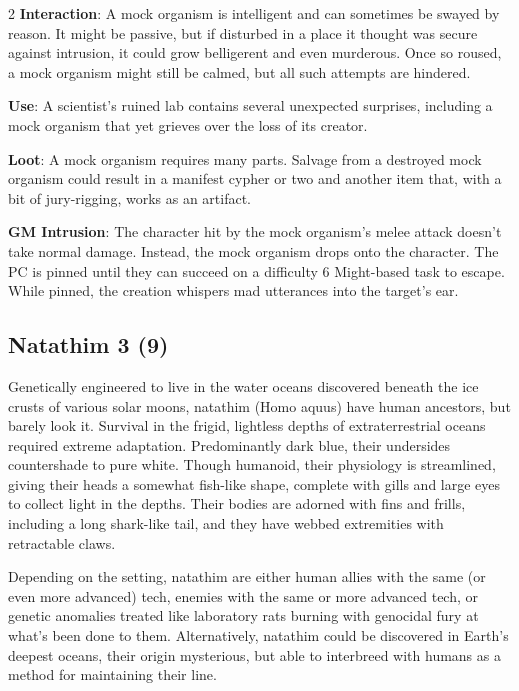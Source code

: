 \begin{multicols}{2}
\textbf{Interaction}: A mock organism is intelligent and can sometimes be swayed by reason. It might be passive, but if disturbed in a place it thought was secure against intrusion, it could grow belligerent and even murderous. Once so roused, a mock organism might still be calmed, but all such attempts are hindered. 

\textbf{Use}: A scientist’s ruined lab contains several unexpected surprises, including a mock organism that yet grieves over the loss of its creator. 

\textbf{Loot}: A mock organism requires many parts. Salvage from a destroyed mock organism could result in a manifest cypher or two and another item that, with a bit of jury-rigging, works as an artifact. 

\textbf{GM Intrusion}: The character hit by the mock organism’s melee attack doesn’t take normal damage. Instead, the mock organism drops onto the character. The PC is pinned until they can succeed on a difficulty 6 Might-based task to escape. While pinned, the creation whispers mad utterances into the target’s ear.

\subsection{Natathim 3 (9)}

Genetically engineered to live in the water oceans discovered beneath the ice crusts of various solar moons, natathim (Homo aquus) have human ancestors, but barely look it. Survival in the frigid, lightless depths of extraterrestrial oceans required extreme adaptation. Predominantly dark blue, their undersides countershade to pure white. Though humanoid, their physiology is streamlined, giving their heads a somewhat fish-like shape, complete with gills and large eyes to collect light in the depths. Their bodies are adorned with fins and frills, including a long shark-like tail, and they have webbed extremities with retractable claws. 

Depending on the setting, natathim are either human allies with the same (or even more advanced) tech, enemies with the same or more advanced tech, or genetic anomalies treated like laboratory rats burning with genocidal fury at what’s been done to them. Alternatively, natathim could be discovered in Earth’s deepest oceans, their origin mysterious, but able to interbreed with humans as a method for maintaining their line. 


\end{multicols}
